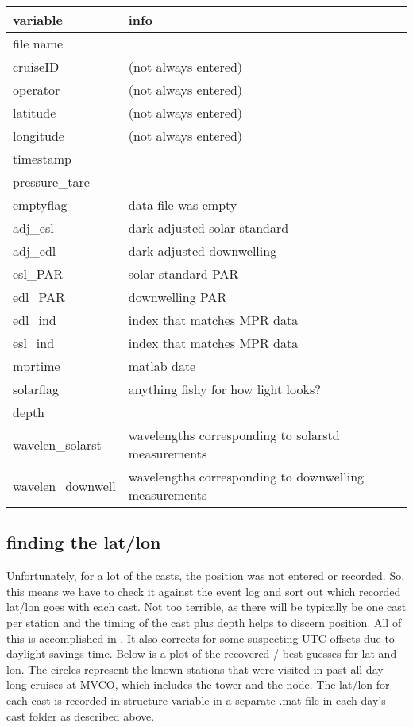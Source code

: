 \documentclass[11pt]{article}
\begin{document}
\begin{table}[h]
\begin{center}
\begin{tabular}{| l | l |}
\hline
\textbf{variable} & \textbf{info} \\
\hline
 file name & \\
cruiseID & (not always entered) \\
operator  &(not always entered)\\
 latitude  &(not always entered) \\
 longitude &(not always entered)\\
 timestamp  &\\
  pressure\_tare  & \\
 emptyflag & data file was empty \\
  adj\_esl & dark adjusted solar standard\\
  adj\_edl & dark adjusted downwelling\\
  esl\_PAR & solar standard PAR\\
 edl\_PAR & downwelling PAR\\
 edl\_ind & index that matches MPR data\\
  esl\_ind & index that matches MPR data\\
   mprtime & matlab date\\
 solarflag & anything fishy for how light looks?\\
  depth &\\
wavelen\_solarst & wavelengths corresponding to solarstd measurements\\
wavelen\_downwell & wavelengths corresponding to downwelling measurements\\
\hline
\end{tabular}
\end{center}
\end{table}

\clearpage

\subsection{finding the lat/lon}

Unfortunately, for a lot of the casts, the position was not entered or recorded. So, this means we have to check it against the event log and sort out which recorded lat/lon goes with each cast. Not too terrible, as there will be typically be one cast per station and the timing of the cast plus depth helps to discern position. All of this is accomplished in . It also corrects for some suspecting UTC offsets due to daylight savings time.
Below is a plot of the recovered / best guesses for lat and lon. The circles represent the known stations that were visited in past all-day long cruises at MVCO, which includes the tower and the node. The lat/lon for each cast is recorded in structure variable in a separate .mat file in each day's cast folder as described above.
\end{document}
